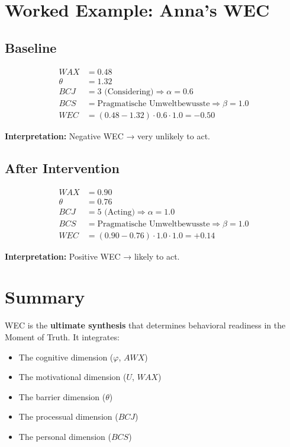 \section{Worked Example: Anna's WEC}

\subsection{Baseline}

\begin{align}
WAX &= 0.48 \\
\theta &= 1.32 \\
BCJ &= 3 \text{ (Considering)} \Rightarrow \alpha = 0.6 \\
BCS &= \text{Pragmatische Umweltbewusste} \Rightarrow \beta = 1.0 \\[6pt]
WEC &= (0.48 - 1.32) \cdot 0.6 \cdot 1.0 = -0.50
\end{align}

\textbf{Interpretation:} Negative WEC → very unlikely to act.

\subsection{After Intervention}

\begin{align}
WAX &= 0.90 \\
\theta &= 0.76 \\
BCJ &= 5 \text{ (Acting)} \Rightarrow \alpha = 1.0 \\
BCS &= \text{Pragmatische Umweltbewusste} \Rightarrow \beta = 1.0 \\[6pt]
WEC &= (0.90 - 0.76) \cdot 1.0 \cdot 1.0 = +0.14
\end{align}

\textbf{Interpretation:} Positive WEC → likely to act.

\section{Summary}

WEC is the \textbf{ultimate synthesis} that determines behavioral readiness
in the Moment of Truth. It integrates:
\begin{itemize}
    \item The cognitive dimension ($\varphi$, $AWX$)
    \item The motivational dimension ($U$, $WAX$)
    \item The barrier dimension ($\theta$)
    \item The processual dimension ($BCJ$)
    \item The personal dimension ($BCS$)
\end{itemize}

